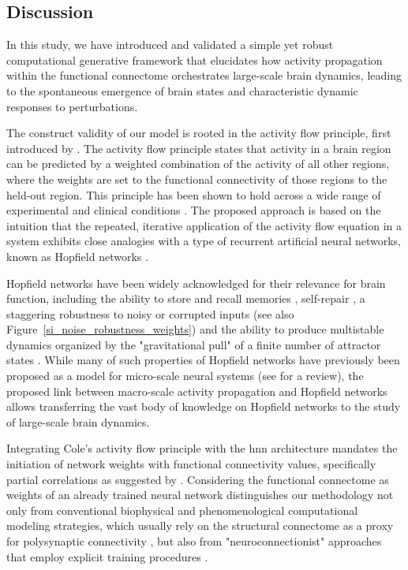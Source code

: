 \documentclass{article}
\begin{document}
\subsection{Discussion}

In this study, we have introduced and validated a simple yet robust computational generative framework that elucidates how activity propagation within the functional connectome orchestrates large-scale brain dynamics, leading to the spontaneous emergence of brain states and characteristic dynamic responses to perturbations.

The construct validity of our model is rooted in the activity flow principle, first introduced by \citet{cole2016activity}. The activity flow principle states that activity in a brain region can be predicted by a weighted combination of the activity of all other regions, where the weights are set to the functional connectivity of those regions to the held-out region. This principle has been shown to hold across a wide range of experimental and clinical conditions \citep{cole2016activity, ito2017cognitive, mill2022network, hearne2021activity, chen2018human}.
The proposed approach is based on the intuition that the repeated, iterative application of the activity flow equation in a system exhibits close analogies with a type of recurrent artificial neural networks, known as Hopfield networks \citep{hopfield1982neural}.

Hopfield networks have been widely acknowledged for their relevance for brain function, including the ability to store and recall memories \citep{hopfield1982neural}, self-repair \citep{murre2003selfreparing},
a staggering robustness to noisy or corrupted inputs \citep{hertz1991introduction} (see also Figure~\ref{si_noise_robustness_weights}) and the ability to produce multistable dynamics organized by the "gravitational pull" of a finite number of attractor states \citep{khona2022attractor}. While many of such properties of Hopfield networks have previously been proposed as a model for micro-scale neural systems (see \cite{khona2022attractor} for a review), the proposed link between macro-scale activity propagation and Hopfield networks allows transferring the vast body of knowledge on Hopfield networks to the study of large-scale brain dynamics.

Integrating Cole's activity flow principle with the \acrshort{hnn} architecture mandates the initiation of network weights with functional connectivity values, specifically partial correlations as suggested by \citet{cole2016activity}.
Considering the functional connectome as weights of an already trained neural network distinguishes our methodology not only from conventional biophysical and phenomenological computational modeling strategies, which usually rely on the structural connectome as a proxy for polysynaptic connectivity \citep{cabral2017functional}, but also from "neuroconnectionist" approaches that employ explicit training procedures \citep{doerig2023neuroconnectionist}.
\end{document}
